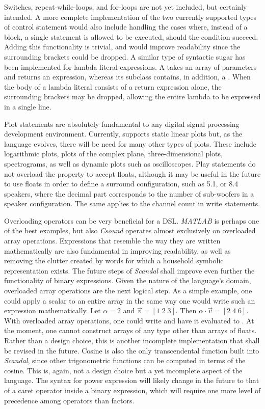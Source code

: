 Switches, repeat-while-loops, and for-loops are not yet included, but certainly intended. A more complete implementation of the two currently supported types of control statement would also include handling the cases where, instead of a block, a single statement is allowed to be executed, should the condition succeed. Adding this functionality is trivial, and would improve readability since the surrounding brackets could be dropped. A similar type of syntactic sugar has been implemented for lambda literal expressions. A  takes an array of parameters and returns an expression, whereas its subclass  contains, in addition, a . When the body of a lambda literal consists of a return expression alone, the surrounding brackets may be dropped, allowing the entire lambda to be expressed in a single line.

Plot statements are absolutely fundamental to any digital signal processing development environment. Currently,  supports static linear plots but, as the language evolves, there will be need for many other types of plots. These include logarithmic plots, plots of the complex plane, three-dimensional plots, spectrograms, as well as dynamic plots such as oscilloscopes. Play statements do not overload the  property to accept floats, although it may be useful in the future to use floats in order to define a surround configuration, such as 5.1, or 8.4 speakers, where the decimal part corresponds to the number of sub-woofers in a speaker configuration. The same applies to the channel count in write statements.

Overloading operators can be very beneficial for a DSL. \emph{MATLAB} is perhaps one of the best examples, but also \emph{Csound} operates almost exclusively on overloaded array operations. Expressions that resemble the way they are written mathematically are also fundamental in improving readability, as well as removing the clutter created by words for which a household symbolic representation exists. The future steps of \emph{Scandal} shall improve even further the functionality of binary expressions. Given the nature of the language's domain, overloaded array operations are the next logical step. As a simple example, one could apply a scalar to an entire array in the same way one would write such an expression mathematically. Let $\alpha = 2$ and $\vec{v} = [1 \; 2 \; 3]$. Then $\alpha \cdot \vec{v} = [2 \; 4 \; 6]$. With overloaded array operations, one could write  and have it evaluated to \il{[2, 4, 6]}. At the moment, one cannot construct arrays of any type other than arrays of floats. Rather than a design choice, this is another incomplete implementation that shall be revised in the future. Cosine is also the only transcendental function built into \emph{Scandal}, since other trigonometric functions can be computed in terms of the cosine. This is, again, not a design choice but a yet incomplete aspect of the language. The syntax for power expression will likely change in the future to that of a caret operator inside a binary expression, which will require one more level of precedence among operators than factors.

